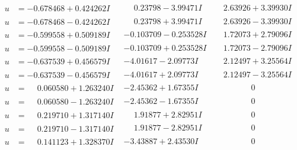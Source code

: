 \documentclass[1p]{elsarticle_modified}
\theoremstyle{definition}
\begin{document}
$$\begin{array}{c|c|c}
\begin{aligned}
u &= -0.678468 + 0.424262 I\end{aligned}
 & \phantom{-}0.23798 - 3.99471 I & \phantom{-}2.63926 + 3.39930 I \\ \hline\begin{aligned}
u &= -0.678468 - 0.424262 I\end{aligned}
 & \phantom{-}0.23798 + 3.99471 I & \phantom{-}2.63926 - 3.39930 I \\ \hline\begin{aligned}
u &= -0.599558 + 0.509189 I\end{aligned}
 & -0.103709 - 0.253528 I & \phantom{-}1.72073 + 2.79096 I \\ \hline\begin{aligned}
u &= -0.599558 - 0.509189 I\end{aligned}
 & -0.103709 + 0.253528 I & \phantom{-}1.72073 - 2.79096 I \\ \hline\begin{aligned}
u &= -0.637539 + 0.456579 I\end{aligned}
 & -4.01617 - 2.09773 I & \phantom{-}2.12497 + 3.25564 I \\ \hline\begin{aligned}
u &= -0.637539 - 0.456579 I\end{aligned}
 & -4.01617 + 2.09773 I & \phantom{-}2.12497 - 3.25564 I \\ \hline\begin{aligned}
u &= \phantom{-}0.060580 + 1.263240 I\end{aligned}
 & -2.45362 + 1.67355 I & \phantom{-0.000000 } 0 \\ \hline\begin{aligned}
u &= \phantom{-}0.060580 - 1.263240 I\end{aligned}
 & -2.45362 - 1.67355 I & \phantom{-0.000000 } 0 \\ \hline\begin{aligned}
u &= \phantom{-}0.219710 + 1.317140 I\end{aligned}
 & \phantom{-}1.91877 + 2.82951 I & \phantom{-0.000000 } 0 \\ \hline\begin{aligned}
u &= \phantom{-}0.219710 - 1.317140 I\end{aligned}
 & \phantom{-}1.91877 - 2.82951 I & \phantom{-0.000000 } 0 \\ \hline\begin{aligned}
u &= \phantom{-}0.141123 + 1.328370 I\end{aligned}
 & -3.43887 + 2.43530 I & \phantom{-0.000000 } 0 \\ \hline\begin{aligned}

\end{aligned}
\end{array}$$
\end{document}

